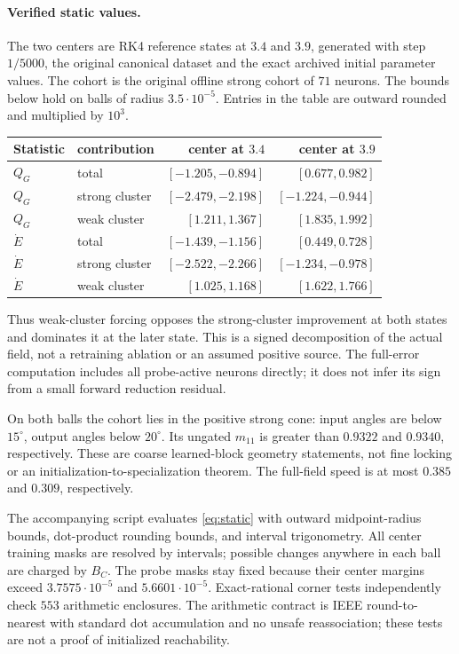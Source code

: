 \documentclass[10pt]{article}
\begin{document}
\paragraph{Verified static values.}
The two centers are RK4 reference states at $3.4$ and $3.9$, generated with
step $1/5000$, the original canonical dataset and the exact archived initial
parameter values. The cohort is the original offline strong cohort of
$71$ neurons. The bounds below hold on balls of radius $3.5\cdot10^{-5}$.
Entries in the table are outward rounded and multiplied by $10^3$.
\begin{center}
\begin{tabular}{llrr}
\toprule
Statistic & contribution & center at $3.4$ & center at $3.9$\\
\midrule
$Q_G$ & total & $[-1.205,-0.894]$ & $[0.677,0.982]$\\
$Q_G$ & strong cluster & $[-2.479,-2.198]$ & $[-1.224,-0.944]$\\
$Q_G$ & weak cluster & $[1.211,1.367]$ & $[1.835,1.992]$\\
$\dot E$ & total & $[-1.439,-1.156]$ & $[0.449,0.728]$\\
$\dot E$ & strong cluster & $[-2.522,-2.266]$ & $[-1.234,-0.978]$\\
$\dot E$ & weak cluster & $[1.025,1.168]$ & $[1.622,1.766]$\\
\bottomrule
\end{tabular}
\end{center}
Thus weak-cluster forcing opposes the strong-cluster improvement at both
states and dominates it at the later state. This is a signed decomposition
of the actual field, not a retraining ablation or an assumed positive source.
The full-error computation includes all probe-active neurons directly;
it does not infer its sign from a small forward reduction residual.

On both balls the cohort lies in the positive strong cone: input angles
are below $15^\circ$, output angles below $20^\circ$. Its ungated
$m_{11}$ is greater than $0.9322$ and $0.9340$, respectively.
These are coarse learned-block geometry statements, not fine locking or
an initialization-to-specialization theorem. The full-field speed is at most
$0.385$ and $0.309$, respectively.

The accompanying script evaluates \eqref{eq:static} with outward
midpoint-radius bounds, dot-product rounding bounds, and interval
trigonometry. All center training masks are resolved by intervals; possible
changes anywhere in each ball are charged by $B_C$. The probe masks stay
fixed because their center margins exceed $3.7575\cdot10^{-5}$ and
$5.6601\cdot10^{-5}$. Exact-rational corner tests independently check
$553$ arithmetic enclosures. The arithmetic contract is IEEE
round-to-nearest with standard dot accumulation and no unsafe reassociation;
these tests are not a proof of initialized reachability.
\end{document}
